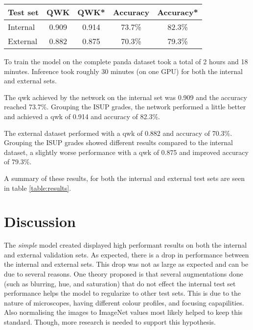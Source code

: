 \documentclass{mod-comjnl}
\begin{document}
\begin{table*}[b]
  \centering
  \caption{The \acrshort{qwk} and accuracy results for both the internal and external dataset. The star (*) indicates grouping of ISUP grades such as: benign, ISUP 1, ISUP 2-3, and ISUP 4-5.}
  \begin{tabular}{@{}lcccc@{}}
    \toprule
    \textbf{Test set} & \textbf{QWK} & \textbf{QWK*} & \textbf{Accuracy} & \textbf{Accuracy*} \\ \midrule
    Internal          & 0.909        & 0.914         & 73.7\%            & 82.3\%             \\
    External          & 0.882        & 0.875         & 70.3\%            & 79.3\%             \\ \bottomrule
  \end{tabular}
  \label{table:results}
\end{table*}

To train the model on the complete \acrshort{panda} dataset took a total of 2 hours and 18 minutes. Inference took roughly 30 minutes (on one GPU) for both the internal and external sets.

The \acrlong{qwk} achieved by the network on the internal set was 0.909 and the accuracy reached 73.7\%. Grouping the ISUP grades, the network performed a little better and achieved a \acrshort{qwk} of 0.914 and accuracy of 82.3\%.

The external dataset performed with a \acrshort{qwk} of 0.882 and accuracy of 70.3\%. Grouping the ISUP grades showed different results compared to the internal dataset, a slightly worse performance with a \acrshort{qwk} of 0.875 and improved accuracy of 79.3\%.

A summary of these results, for both the internal and external test sets are seen in table \ref{table:results}.


\section{Discussion}
The \textit{simple} model created displayed high performant results on both the internal and external validation sets. As expected, there is a drop in performance between the internal and external sets. This drop was not as large as expected and can be due to several reasons. One theory proposed is that several augmentations done (such as blurring, hue, and saturation) that do not effect the internal test set performance helps the model to regularize to other test sets. This is due to the nature of microscopes, having different colour profiles, and focusing capapilities. Also normalising the images to ImageNet values most likely helped to keep this standard. Though, more research is needed to support this hypothesis.
\end{document}
